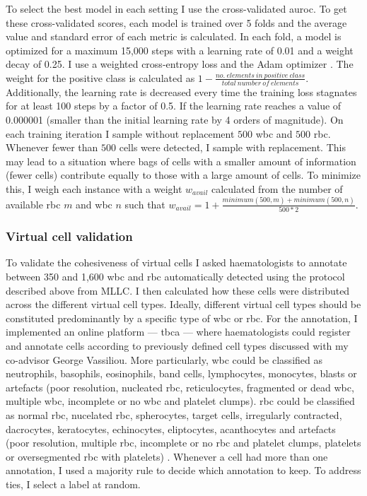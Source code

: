 To select the best model in each setting I use the cross-validated \ac{auroc}. To get these cross-validated scores, each model is trained over 5 folds and the average value and standard error of each metric is calculated. In each fold, a model is optimized for a maximum 15,000 steps with a learning rate of 0.01 and a weight decay of 0.25. I use a weighted cross-entropy loss and the Adam optimizer \cite{Kingma2014-zd}. The weight for the positive class is calculated as $1 - \frac{no.\ elements\ in\ positive\ class}{total\ number\ of\ elements}$. Additionally, the learning rate is decreased every time the training loss stagnates for at least 100 steps by a factor of 0.5. If the learning rate reaches a value of 0.000001 (smaller than the initial learning rate by 4 orders of magnitude). On each training iteration I sample without replacement $500$ \ac{wbc} and $500$ \ac{rbc}. Whenever fewer than $500$ cells were detected, I sample with replacement. This may lead to a situation where bags of cells with a smaller amount of information (fewer cells) contribute equally to those with a large amount of cells. To minimize this, I weigh each instance with a weight $w_{avail}$ calculated from the number of available \ac{rbc} $m$ and \ac{wbc} $n$ such that $w_{avail} = 1 + \frac{minimum(500,m) + minimum(500,n)}{500*2}$.

\subsubsection{Virtual cell validation}

To validate the cohesiveness of virtual cells I asked  haematologists to annotate between 350 and 1,600 \ac{wbc} and \ac{rbc} automatically detected using the protocol described above from MLLC. I then calculated how these cells were distributed across the different virtual cell types. Ideally, different virtual cell types should be constituted predominantly by a specific type of \ac{wbc} or \ac{rbc}. For the annotation, I implemented an online platform --- \ac{tbca} --- where haematologists could register and annotate cells according to previously defined cell types discussed with my co-advisor George Vassiliou. More particularly, \ac{wbc} could be classified as neutrophils, basophils, eosinophils, band cells, lymphocytes, monocytes, blasts or artefacts (poor resolution, nucleated \ac{rbc}, reticulocytes, fragmented or dead \ac{wbc}, multiple \ac{wbc}, incomplete or no \ac{wbc} and platelet clumps). \Ac{rbc} could be classified as normal \ac{rbc}, nucelated \ac{rbc}, spherocytes, target cells, irregularly contracted, dacrocytes, keratocytes, echinocytes, eliptocytes, acanthocytes and artefacts (poor resolution, multiple \ac{rbc}, incomplete or no \ac{rbc} and platelet clumps, platelets or oversegmented \ac{rbc} with platelets) . Whenever a cell had more than one annotation, I used a majority rule to decide which annotation to keep. To address ties, I select a label at random.

